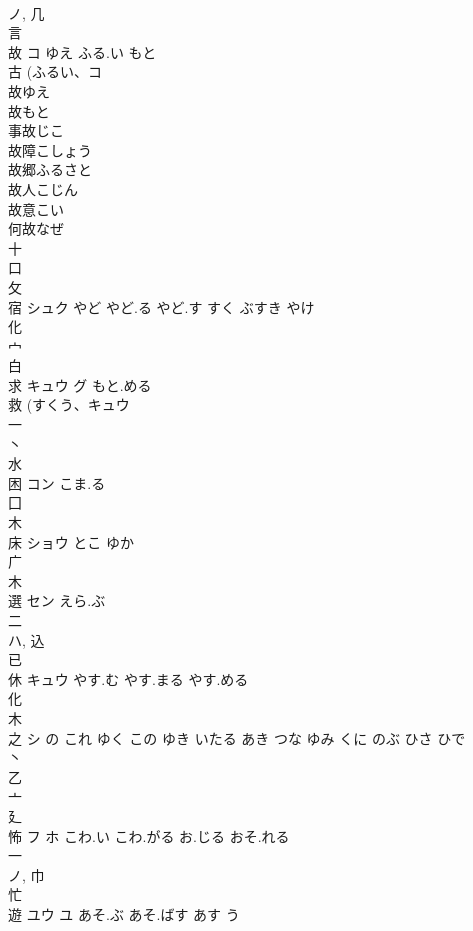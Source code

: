 \documentclass[8pt]{extreport}
\begin{document}
\begin{CJK}{UTF8}{min}
\\	ノ, 几 
\\	言 
\\	故	コ	ゆえ ふる.い もと	
\\	古 (ふるい、コ 
\\	故ゆえ 
\\	故もと 
\\	事故じこ 
\\	故障こしょう 
\\	故郷ふるさと 
\\	故人こじん 
\\	故意こい 
\\	何故なぜ 
\\	十 
\\	口 
\\	攵 
\\	宿	シュク	やど やど.る やど.す すく ぶすき やけ	
\\	化 
\\	宀 
\\	白 
\\	求	キュウ グ	もと.める	
\\	救 (すくう、キュウ 
\\	一 
\\	丶 
\\	水 
\\	困	コン	こま.る	
\\	囗 
\\	木 
\\	床	ショウ	とこ ゆか	
\\	广 
\\	木 
\\	選	セン	えら.ぶ	
\\	二 
\\	ハ, 込 
\\	已 
\\	休	キュウ	やす.む やす.まる やす.める	
\\	化 
\\	木 
\\	之	シ	の これ ゆく この ゆき いたる あき つな ゆみ くに のぶ ひさ ひで	
\\	丶 
\\	乙 
\\	亠 
\\	廴 
\\	怖	フ ホ	こわ.い こわ.がる お.じる おそ.れる	
\\	一 
\\	ノ, 巾 
\\	忙 
\\	遊	ユウ ユ	あそ.ぶ あそ.ばす あす う	

\end{CJK}
\end{document}
